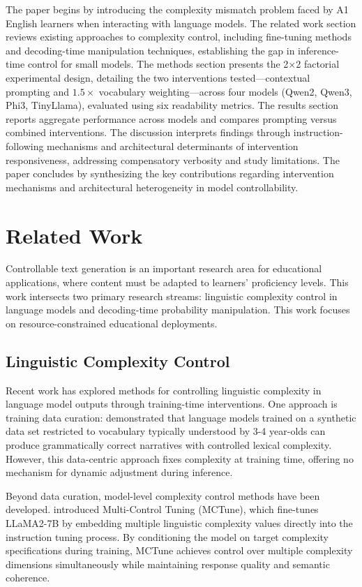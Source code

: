 \documentclass[10pt, a4paper]{article}
\begin{document}
The paper begins by introducing the complexity mismatch problem faced by A1 English learners when interacting with language models. The related work section reviews existing approaches to complexity control, including fine-tuning methods and decoding-time manipulation techniques, establishing the gap in inference-time control for small models. The methods section presents the 2×2 factorial experimental design, detailing the two interventions tested—contextual prompting and $1.5\times$ vocabulary weighting—across four models (Qwen2, Qwen3, Phi3, TinyLlama), evaluated using six readability metrics. The results section reports aggregate performance across models and compares prompting versus combined interventions. The discussion interprets findings through instruction-following mechanisms and architectural determinants of intervention responsiveness, addressing compensatory verbosity and study limitations. The paper concludes by synthesizing the key contributions regarding intervention mechanisms and architectural heterogeneity in model controllability.

\section{Related Work}

Controllable text generation is an important research area for educational applications, where content must be adapted to learners' proficiency levels. This work intersects two primary research streams: linguistic complexity control in language models and decoding-time probability manipulation. This work focuses on resource-constrained educational deployments.

\subsection{Linguistic Complexity Control}

Recent work has explored methods for controlling linguistic complexity in language model outputs through training-time interventions. One approach is training data curation: \citet{eldan2023tinystories} demonstrated that language models trained on a synthetic data set restricted to vocabulary typically understood by 3-4 year-olds can produce grammatically correct narratives with controlled lexical complexity. However, this data-centric approach fixes complexity at training time, offering no mechanism for dynamic adjustment during inference.

Beyond data curation, model-level complexity control methods have been developed. \citet{nguyen2024multi} introduced Multi-Control Tuning (MCTune), which fine-tunes LLaMA2-7B by embedding multiple linguistic complexity values directly into the instruction tuning process. By conditioning the model on target complexity specifications during training, MCTune achieves control over multiple complexity dimensions simultaneously while maintaining response quality and semantic coherence.
\end{document}
